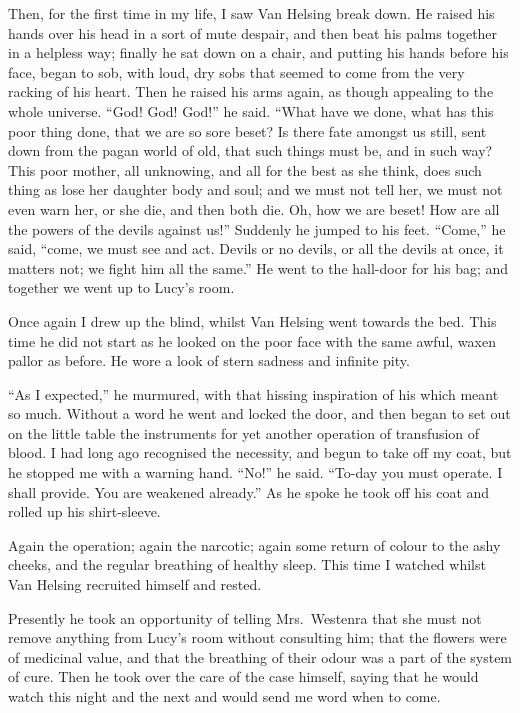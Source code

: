 \documentclass[12pt,openright]{book}
\begin{document}
Then, for the first time in my life, I saw Van Helsing break down. He raised his hands over his head in a sort of mute despair, and then beat his palms together in a helpless way; finally he sat down on a chair, and putting his hands before his face, began to sob, with loud, dry sobs that seemed to come from the very racking of his heart. Then he raised his arms again, as though appealing to the whole universe. “God! God! God!” he said. “What have we done, what has this poor thing done, that we are so sore beset? Is there fate amongst us still, sent down from the pagan world of old, that such things must be, and in such way? This poor mother, all unknowing, and all for the best as she think, does such thing as lose her daughter body and soul; and we must not tell her, we must not even warn her, or she die, and then both die. Oh, how we are beset! How are all the powers of the devils against us!” Suddenly he jumped to his feet. “Come,” he said, “come, we must see and act. Devils or no devils, or all the devils at once, it matters not; we fight him all the same.” He went to the hall-door for his bag; and together we went up to Lucy’s room.

Once again I drew up the blind, whilst Van Helsing went towards the bed. This time he did not start as he looked on the poor face with the same awful, waxen pallor as before. He wore a look of stern sadness and infinite pity.

“As I expected,” he murmured, with that hissing inspiration of his which meant so much. Without a word he went and locked the door, and then began to set out on the little table the instruments for yet another operation of transfusion of blood. I had long ago recognised the necessity, and begun to take off my coat, but he stopped me with a warning hand. “No!” he said. “To-day you must operate. I shall provide. You are weakened already.” As he spoke he took off his coat and rolled up his shirt-sleeve.

Again the operation; again the narcotic; again some return of colour to the ashy cheeks, and the regular breathing of healthy sleep. This time I watched whilst Van Helsing recruited himself and rested.

Presently he took an opportunity of telling Mrs. Westenra that she must not remove anything from Lucy’s room without consulting him; that the flowers were of medicinal value, and that the breathing of their odour was a part of the system of cure. Then he took over the care of the case himself, saying that he would watch this night and the next and would send me word when to come.
\end{document}
